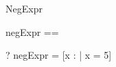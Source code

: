 \begin{zsection}
  \SECTION NegExpr
\end{zsection}

\begin{zed}
  negExpr == \lnot [x : \nat | x = 5]
\end{zed}

\begin{zed} \vdash? negExpr = [x : \nat | \lnot x = 5] \end{zed}

